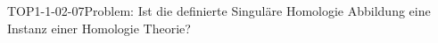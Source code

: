 
\begin{REM}{TOP1-1-02-07}{Problem: Ist die definierte Singuläre Homologie Abbildung eine Instanz einer Homologie Theorie?}
\end{REM}
